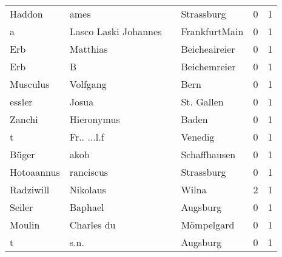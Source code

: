 \begin{center}
\begin{tiny}
\begin{longtabu}{llllrr}
                   Haddon &                               ames &             &                                  Strassburg &          0 &         1 \\
                        a &               Lasco Laski Johannes &             &                               FrankfurtMain &          0 &         1 \\
                      Erb &                           Matthias &             &                               Beicheaireier &          0 &         1 \\
                      Erb &                                  B &             &                                Beichemreier &          0 &         1 \\
                 Musculus &                           Volfgang &             &                                        Bern &          0 &         1 \\
                   essler &                              Josua &             &                                  St. Gallen &          0 &         1 \\
                   Zanchi &                         Hieronymus &             &                                       Baden &          0 &         1 \\
                        t &                        Fr.. ...l.f &             &                                     Venedig &          0 &         1 \\
                    Büger &                               akob &             &                                Schaffhausen &          0 &         1 \\
               Hotoaannus &                          ranciscus &             &                                  Strassburg &          0 &         1 \\
                Radziwill &                           Nikolaus &             &                                       Wilna &          2 &         1 \\
                   Seiler &                            Baphael &             &                                    Augsburg &          0 &         1 \\
                   Moulin &                         Charles du &             &                                  Mömpelgard &          0 &         1 \\
                        t &                               s.n. &             &                                    Augsburg &          0 &         1 \\

\end{longtabu}
\end{tiny}
\end{center}
